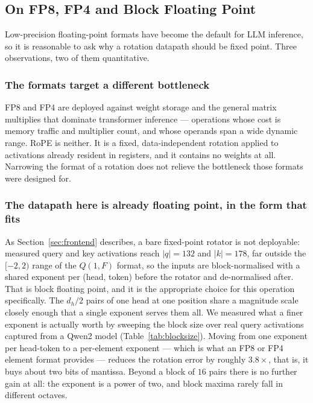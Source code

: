 %
%

\subsection{On FP8, FP4 and Block Floating Point}
\label{sec:formats}

Low-precision floating-point formats have become the default for LLM
inference, so it is reasonable to ask why a rotation datapath should be fixed
point. Three observations, two of them quantitative.

\subsubsection{The formats target a different bottleneck}
FP8 and FP4 are deployed against weight storage and the general matrix
multiplies that dominate transformer inference --- operations whose cost is
memory traffic and multiplier count, and whose operands span a wide dynamic
range. RoPE is neither. It is a fixed, data-independent rotation applied to
activations already resident in registers, and it contains no weights at all.
Narrowing the format of a rotation does not relieve the bottleneck those
formats were designed for.

\subsubsection{The datapath here is already floating point, in the form that fits}
As Section~\ref{sec:frontend} describes, a bare fixed-point rotator is not
deployable: measured query and key activations reach $|q| = 132$ and
$|k| = 178$, far outside the $[-2,2)$ range of the $Q(1,F)$ format, so the
inputs are block-normalised with a shared exponent per (head, token) before
the rotator and de-normalised after. That is block floating point, and it is
the appropriate choice for this operation specifically. The $d_h/2$ pairs of
one head at one position share a magnitude scale closely enough that a single
exponent serves them all. We measured what a finer exponent is actually worth
by sweeping the block size over real query activations captured from a Qwen2
model (Table~\ref{tab:blocksize}). Moving from one exponent per head-token to
a per-element exponent --- which is what an FP8 or FP4 element format provides
--- reduces the rotation error by roughly $3.8\times$, that is, it buys about
two bits of mantissa. Beyond a block of $16$ pairs there is no further gain at
all: the exponent is a power of two, and block maxima rarely fall in different
octaves.


